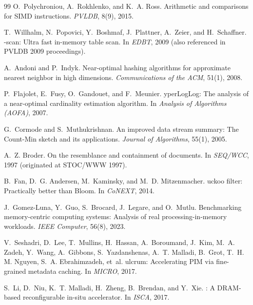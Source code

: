 \documentclass[10pt]{article}
\begin{document}
\begin{thebibliography}{99}
O.~Polychroniou, A.~Rokhlenko, and K.~A. Ross.
\newblock Arithmetic and comparisons for {S}{I}{M}{D} instructions.
\newblock \emph{PVLDB}, 8(9), 2015.

T.~Willhalm, N.~Popovici, Y.~Boshmaf, J.~Plattner, A.~Zeier, and H.~Schaffner.
-scan: Ultra fast in-memory table scan.
\newblock In \emph{EDBT}, 2009 (also referenced in PVLDB 2009 proceedings).

A.~Andoni and P.~Indyk.
\newblock Near-optimal hashing algorithms for approximate nearest neighbor in
  high dimensions.
\newblock \emph{Communications of the ACM}, 51(1), 2008.

P.~Flajolet, E.~Fusy, O.~Gandouet, and F.~Meunier.
yper{L}og{L}og: The analysis of a near-optimal cardinality
  estimation algorithm.
\newblock In \emph{Analysis of Algorithms (AOFA)}, 2007.

G.~Cormode and S.~Muthukrishnan.
\newblock An improved data stream summary: The {C}ount-{M}in sketch and its
  applications.
\newblock \emph{Journal of Algorithms}, 55(1), 2005.

A.~Z. Broder.
\newblock On the resemblance and containment of documents.
\newblock In \emph{SEQ/WCC}, 1997 (originated at STOC/WWW 1997).

B.~Fan, D.~G. Andersen, M.~Kaminsky, and M.~D. Mitzenmacher.
uckoo filter: Practically better than {B}loom.
\newblock In \emph{CoNEXT}, 2014.

J.~Gomez-Luna, Y.~Guo, S.~Brocard, J.~Legare, and O.~Mutlu.
\newblock Benchmarking memory-centric computing systems: Analysis of real
  processing-in-memory workloads.
\newblock \emph{IEEE Computer}, 56(8), 2023.

V.~Seshadri, D.~Lee, T.~Mullins, H.~Hassan, A.~Boroumand, J.~Kim, M.~A. Zadeh,
Y.~Wang, A.~Gibbons, S.~Yazdanshenas, A.~T. Malladi, B.~Grot, T.~H. M. Nguyen,
S.~A. Ebrahimzadeh, et~al.
ulcrum: Accelerating \mbox{PIM} via fine-grained metadata caching.
\newblock In \emph{MICRO}, 2017.

S.~Li, D.~Niu, K.~T. Malladi, H.~Zheng, B.~Brendan, and Y.~Xie.
: A {DRAM}-based reconfigurable in-situ accelerator.
\newblock In \emph{ISCA}, 2017.


\end{thebibliography}
\end{document}
